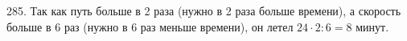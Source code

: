 285. Так как путь больше в 2 раза (нужно в 2 раза больше времени), а скорость больше в 6 раз (нужно в 6 раз меньше времени), он летел $24\cdot2:6=8$ минут.\\
